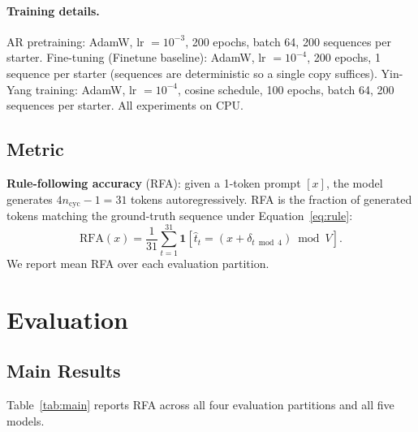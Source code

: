 \documentclass[10pt,twocolumn]{article}
\begin{document}
\paragraph{Training details.}
AR pretraining: AdamW, lr $= 10^{-3}$, 200 epochs, batch 64, 200 sequences per starter.
Fine-tuning (Finetune baseline): AdamW, lr $= 10^{-4}$, 200 epochs, 1 sequence per starter (sequences are deterministic so a single copy suffices).
Yin-Yang training: AdamW, lr $= 10^{-4}$, cosine schedule, 100 epochs, batch 64, 200 sequences per starter. All experiments on CPU.

\subsection{Metric}

\textbf{Rule-following accuracy} (RFA): given a 1-token prompt $[x]$, the model generates $4n_\text{cyc} - 1 = 31$ tokens autoregressively. RFA is the fraction of generated tokens matching the ground-truth sequence under Equation~\eqref{eq:rule}:
\begin{equation}
  \text{RFA}(x) = \frac{1}{31}\sum_{t=1}^{31} \mathbf{1}\!\left[\hat{t}_t = (x + \delta_{t \bmod 4}) \bmod V\right].
\end{equation}
We report mean RFA over each evaluation partition.

\section{Evaluation}

\subsection{Main Results}

Table~\ref{tab:main} reports RFA across all four evaluation partitions and all five models.
\end{document}

